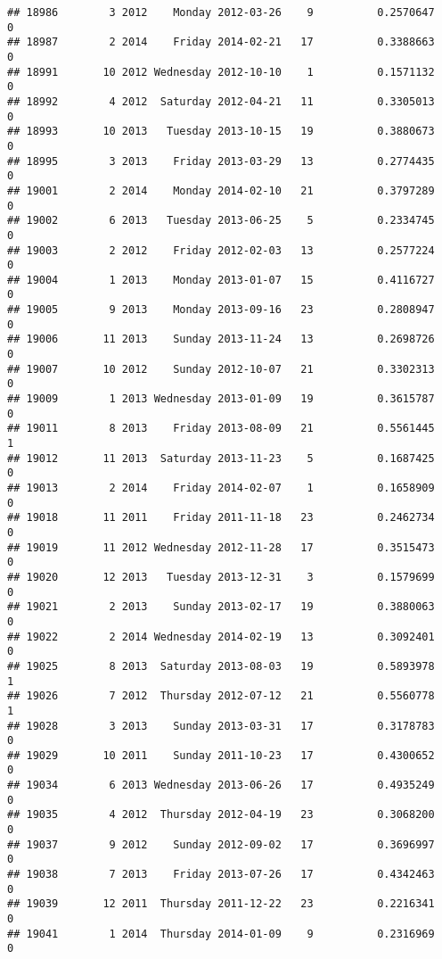 \documentclass[
]{article}
\begin{document}
\begin{verbatim}
## 18986        3 2012    Monday 2012-03-26    9          0.2570647             0
## 18987        2 2014    Friday 2014-02-21   17          0.3388663             0
## 18991       10 2012 Wednesday 2012-10-10    1          0.1571132             0
## 18992        4 2012  Saturday 2012-04-21   11          0.3305013             0
## 18993       10 2013   Tuesday 2013-10-15   19          0.3880673             0
## 18995        3 2013    Friday 2013-03-29   13          0.2774435             0
## 19001        2 2014    Monday 2014-02-10   21          0.3797289             0
## 19002        6 2013   Tuesday 2013-06-25    5          0.2334745             0
## 19003        2 2012    Friday 2012-02-03   13          0.2577224             0
## 19004        1 2013    Monday 2013-01-07   15          0.4116727             0
## 19005        9 2013    Monday 2013-09-16   23          0.2808947             0
## 19006       11 2013    Sunday 2013-11-24   13          0.2698726             0
## 19007       10 2012    Sunday 2012-10-07   21          0.3302313             0
## 19009        1 2013 Wednesday 2013-01-09   19          0.3615787             0
## 19011        8 2013    Friday 2013-08-09   21          0.5561445             1
## 19012       11 2013  Saturday 2013-11-23    5          0.1687425             0
## 19013        2 2014    Friday 2014-02-07    1          0.1658909             0
## 19018       11 2011    Friday 2011-11-18   23          0.2462734             0
## 19019       11 2012 Wednesday 2012-11-28   17          0.3515473             0
## 19020       12 2013   Tuesday 2013-12-31    3          0.1579699             0
## 19021        2 2013    Sunday 2013-02-17   19          0.3880063             0
## 19022        2 2014 Wednesday 2014-02-19   13          0.3092401             0
## 19025        8 2013  Saturday 2013-08-03   19          0.5893978             1
## 19026        7 2012  Thursday 2012-07-12   21          0.5560778             1
## 19028        3 2013    Sunday 2013-03-31   17          0.3178783             0
## 19029       10 2011    Sunday 2011-10-23   17          0.4300652             0
## 19034        6 2013 Wednesday 2013-06-26   17          0.4935249             0
## 19035        4 2012  Thursday 2012-04-19   23          0.3068200             0
## 19037        9 2012    Sunday 2012-09-02   17          0.3696997             0
## 19038        7 2013    Friday 2013-07-26   17          0.4342463             0
## 19039       12 2011  Thursday 2011-12-22   23          0.2216341             0
## 19041        1 2014  Thursday 2014-01-09    9          0.2316969             0

\end{verbatim}
\end{document}

